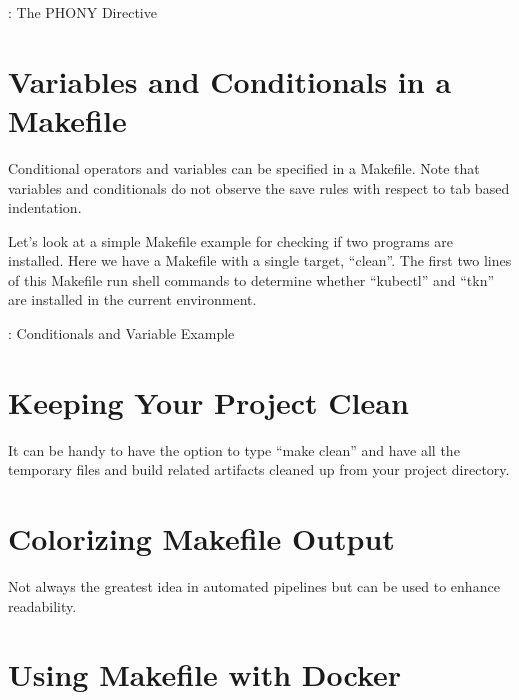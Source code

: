 \justifying
\begin{mybox}{\thetcbcounter: The PHONY Directive}
	
\end{mybox}


\section{Variables and Conditionals in a Makefile}

\justifying
Conditional operators and variables can be specified in a Makefile. Note that variables and conditionals do not observe the save rules with respect to tab based indentation.

\justifying
Let's look at a simple Makefile example for checking if two programs are installed. Here we have a Makefile
with a single target, ``clean''. The first two lines of this Makefile run shell commands to determine
whether ``kubectl'' and ``tkn'' are installed in the current environment.

\begin{mybox}{\thetcbcounter: Conditionals and Variable Example}
	
\end{mybox}

\section{Keeping Your Project Clean}

\justifying
It can be handy to have the option to type ``make clean'' and have all the temporary files and build related artifacts cleaned up from your project directory.


\section{Colorizing Makefile Output}

\justifying
Not always the greatest idea in automated pipelines but can be used to enhance readability.


\section{Using Makefile with Docker}

